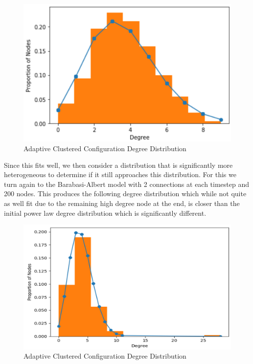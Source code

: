 \documentclass[letterpaper, 12 pt, conference]{ieeeconf}
\begin{document}
\begin{figure}[ht]
    \centering
    \includegraphics[width=\columnwidth]{ccf.png}
    \caption{Adaptive Clustered Configuration Degree Distribution}
    \label{fig:cc}
\end{figure}
\newpage
Since this fits well, we then consider a distribution that is significantly more heterogeneous to determine if it still approaches this distribution. For this we turn again to the Barabasi-Albert model with 2 connections at each timestep and 200 nodes. This produces the following degree distribution which while not quite as well fit due to the remaining high degree node at the end, is closer than the initial power law degree distribution which is significantly different. 
\begin{figure}[ht]
    \centering
    \includegraphics[width=\columnwidth]{ba.png}
    \caption{Adaptive Clustered Configuration Degree Distribution}
    \label{fig:ba}
\end{figure}
\end{document}

